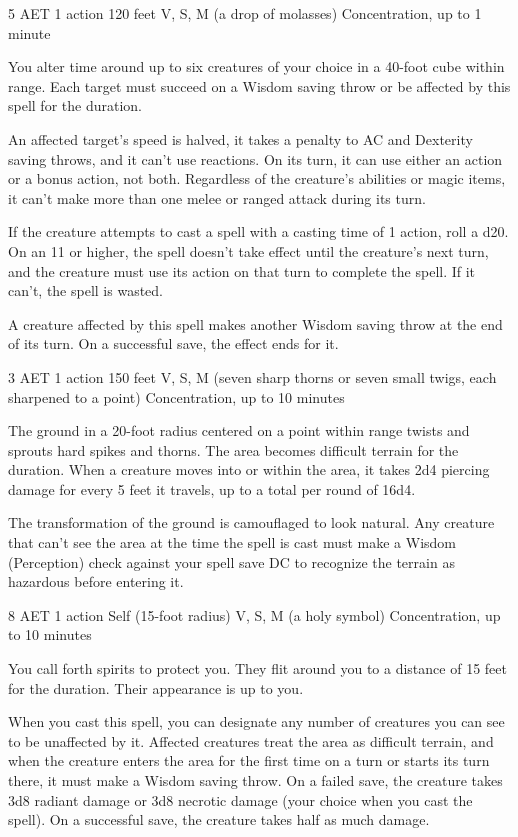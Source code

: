 {5 AET}
{1 action}
{120 feet}
{V, S, M (a drop of molasses)}
{Concentration, up to 1 minute}

You alter time around up to six creatures of your choice in a 40-foot cube within range. Each target must succeed on a Wisdom saving throw or be affected by this spell for the duration.

An affected target's speed is halved, it takes a  penalty to AC and Dexterity saving throws, and it can't use reactions. On its turn, it can use either an action or a bonus action, not both. Regardless of the creature's abilities or magic items, it can't make more than one melee or ranged attack during its turn.

If the creature attempts to cast a spell with a casting time of 1 action, roll a d20. On an 11 or higher, the spell doesn't take effect until the creature's next turn, and the creature must use its action on that turn to complete the spell. If it can't, the spell is wasted.

A creature affected by this spell makes another Wisdom saving throw at the end of its turn. On a successful save, the effect ends for it.


{3 AET}
{1 action}
{150 feet}
{V, S, M (seven sharp thorns or seven small twigs, each sharpened to a point)}
{Concentration, up to 10 minutes}

The ground in a 20-foot radius centered on a point within range twists and sprouts hard spikes and thorns. The area becomes difficult terrain for the duration. When a creature moves into or within the area, it takes 2d4 piercing damage for every 5 feet it travels, up to a total per round of 16d4.

The transformation of the ground is camouflaged to look natural. Any creature that can't see the area at the time the spell is cast must make a Wisdom (Perception) check against your spell save DC to recognize the terrain as hazardous before entering it.


{8 AET}
{1 action}
{Self (15-foot radius)}
{V, S, M (a holy symbol)}
{Concentration, up to 10 minutes}

You call forth spirits to protect you. They flit around you to a distance of 15 feet for the duration. Their appearance is up to you.

When you cast this spell, you can designate any number of creatures you can see to be unaffected by it. Affected creatures treat the area as difficult terrain, and when the creature enters the area for the first time on a turn or starts its turn there, it must make a Wisdom saving throw. On a failed save, the creature takes 3d8 radiant damage or 3d8 necrotic damage (your choice when you cast the spell). On a successful save, the creature takes half as much damage.

